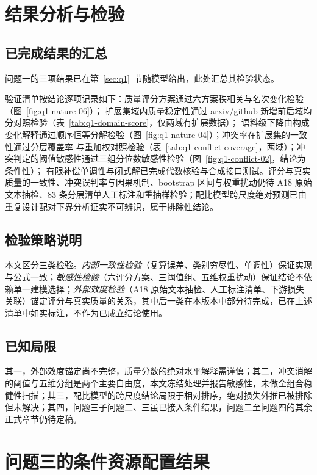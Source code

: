 \section{结果分析与检验}
\label{sec:results}

\subsection{已完成结果的汇总}
问题一的三项结果已在第~\ref{sec:q1}~节随模型给出，此处汇总其检验状态。

验证清单按结论逐项记录如下：质量评分方案通过六方案秩相关与名次变化检验（图~\ref{fig:q1-nature-06}）；
扩展集域内质量稳定性通过 arxiv/github 新增前后域均分对照检验（表~\ref{tab:q1-domain-score}，仅两域有扩展数据）；
语料级下降由构成变化解释通过顺序恒等分解检验（图~\ref{fig:q1-nature-04}）；冲突率在扩展集的一致性通过分层覆盖率
与重加权对照检验（表~\ref{tab:q1-conflict-coverage}，两域）；冲突判定的阈值敏感性通过三组分位数敏感性检验（图~\ref{fig:q1-conflict-02}，结论为条件性）；
有限补偿单调性与闭式解已完成代数核验与合成接口测试。评分与真实质量的一致性、冲突误判率与因果机制、bootstrap 区间与权重扰动仍待 A18 原始文本抽检、83 条分层清单人工标注和重抽样检验；配比模型跨尺度绝对预测已由重复设计配对下界分析证实不可辨识，属于排除性结论。

\subsection{检验策略说明}
本文区分三类检验。\emph{内部一致性检验}（复算误差、类别穷尽性、单调性）保证实现与公式一致；\emph{敏感性检验}（六评分方案、三阈值组、五维权重扰动）保证结论不依赖单一建模选择；\emph{外部效度检验}（A18 原始文本抽检、人工标注清单、下游损失关联）锚定评分与真实质量的关系，其中后一类在本版本中部分待完成，已在上述清单中如实标注，不作为已成立结论使用。

\subsection{已知局限}
其一，外部效度锚定尚不完整，质量分数的绝对水平解释需谨慎；其二，冲突消解的阈值与五维分组是两个主要自由度，本文冻结处理并报告敏感性，未做全组合稳健性扫描；其三，配比模型的跨尺度结论局限于相对排序，绝对损失外推已被排除但未解决；其四，问题三子问题二、三虽已接入条件结果，问题二至问题四的其余正式章节仍待定稿。

\section{问题三的条件资源配置结果}
\label{sec:q3-results}

